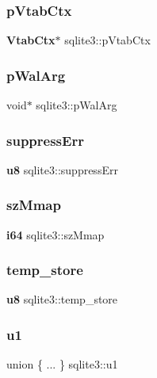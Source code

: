 \mbox{\label{structsqlite3_a6c0dc858220431633ce44351a6ce2962}} 
\subsubsection{pVtabCtx}
{\footnotesize\ttfamily \textbf{ Vtab\+Ctx}$\ast$ sqlite3\+::p\+Vtab\+Ctx}

\mbox{\label{structsqlite3_aa75309c2e522cf0f6ccbd7a3c38e1075}} 
\subsubsection{pWalArg}
{\footnotesize\ttfamily void$\ast$ sqlite3\+::p\+Wal\+Arg}

\mbox{\label{structsqlite3_ac6c776a68a0ce0cbacfc3c9fa5129252}} 
\subsubsection{suppressErr}
{\footnotesize\ttfamily \textbf{ u8} sqlite3\+::suppress\+Err}

\mbox{\label{structsqlite3_a417e58ace305325f40894c14fbd8af0d}} 
\subsubsection{szMmap}
{\footnotesize\ttfamily \textbf{ i64} sqlite3\+::sz\+Mmap}

\mbox{\label{structsqlite3_acc46921b20f505ddce64526cac717af3}} 
\subsubsection{temp\_store}
{\footnotesize\ttfamily \textbf{ u8} sqlite3\+::temp\+\_\+store}

\mbox{\label{structsqlite3_ae06d3039306bf801a8bd9cb47e2fdf30}} 
\subsubsection{u1}
{\footnotesize\ttfamily union \{ ... \}   sqlite3\+::u1}


